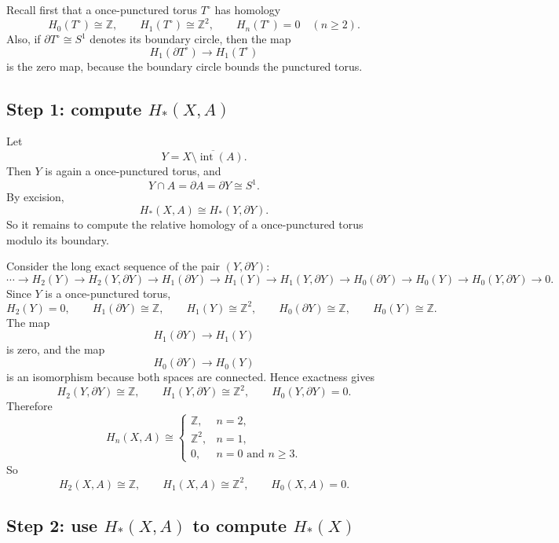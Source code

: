\documentclass[12pt,a4paper]{article}
\theoremstyle{notespace}
\begin{document}
Recall first that a once-punctured torus \(T^\circ\) has homology
\[
H_0(T^\circ)\cong \mathbb Z,\qquad
H_1(T^\circ)\cong \mathbb Z^2,\qquad
H_n(T^\circ)=0\quad(n\ge 2).
\]
Also, if \(\partial T^\circ\cong S^1\) denotes its boundary circle, then the map
\[
H_1(\partial T^\circ)\to H_1(T^\circ)
\]
is the zero map, because the boundary circle bounds the punctured torus.

\subsection{Step 1: compute \(H_*(X,A)\)}

Let
\[
Y=\overline{X\setminus \operatorname{int}(A)}.
\]
Then \(Y\) is again a once-punctured torus, and
\[
Y\cap A=\partial A=\partial Y\cong S^1.
\]
By excision,
\[
H_*(X,A)\cong H_*(Y,\partial Y).
\]
So it remains to compute the relative homology of a once-punctured torus modulo its boundary.

Consider the long exact sequence of the pair \((Y,\partial Y)\):
\[
\cdots\to H_2(Y)\to H_2(Y,\partial Y)\to H_1(\partial Y)\to H_1(Y)\to H_1(Y,\partial Y)\to H_0(\partial Y)\to H_0(Y)\to H_0(Y,\partial Y)\to 0.
\]
Since \(Y\) is a once-punctured torus,
\[
H_2(Y)=0,\qquad
H_1(\partial Y)\cong \mathbb Z,\qquad
H_1(Y)\cong \mathbb Z^2,\qquad
H_0(\partial Y)\cong \mathbb Z,\qquad
H_0(Y)\cong \mathbb Z.
\]
The map
\[
H_1(\partial Y)\to H_1(Y)
\]
is zero, and the map
\[
H_0(\partial Y)\to H_0(Y)
\]
is an isomorphism because both spaces are connected. Hence exactness gives
\[
H_2(Y,\partial Y)\cong \mathbb Z,
\qquad
H_1(Y,\partial Y)\cong \mathbb Z^2,
\qquad
H_0(Y,\partial Y)=0.
\]
Therefore
\[
H_n(X,A)\cong
\begin{cases}
	\mathbb Z, & n=2,\\[1mm]
	\mathbb Z^2, & n=1,\\[1mm]
	0, & n=0\text{ and }n\ge 3.
\end{cases}
\]
So
\[
\boxed{
	H_2(X,A)\cong \mathbb Z,\qquad
	H_1(X,A)\cong \mathbb Z^2,\qquad
	H_0(X,A)=0.
}
\]

\subsection{Step 2: use \(H_*(X,A)\) to compute \(H_*(X)\)}
\end{document}
